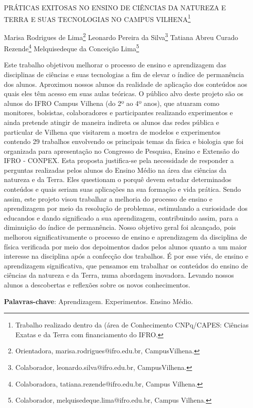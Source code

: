 \documentclass[article,12pt,onesidea,4paper,english,brazil]{abntex2}
\begin{document}
	
	
	\frenchspacing 
	
	\begin{center}
		\LARGE PRÁTICAS EXITOSAS NO ENSINO DE CIÊNCIAS DA NATUREZA E TERRA E SUAS TECNOLOGIAS NO CAMPUS VILHENA\footnote{Trabalho realizado dentro da (área de Conhecimento CNPq/CAPES: Ciências Exatas e da Terra com financiamento do IFRO.}
		
		\normalsize
		Marisa Rodrigues de Lima\footnote{Orientadora, marisa.rodrigues@ifro.edu.br, CampusVilhena.} 
		Leonardo Pereira da Silva\footnote{Colaborador, leonardo.silva@ifro.edu.br, CampusVilhena.} 
		Tatiana Abreu Curado Rezende\footnote{Colaboradora, tatiana.rezende@ifro.edu.br, Campus Vilhena.} 
		Melquisedeque da Conceição Lima\footnote{Colaborador, melquisedeque.lima@ifro.edu.br, Campus Vilhena.} 
	\end{center}
	
	\noindent Este trabalho objetivou melhorar o processo de ensino e aprendizagem das disciplinas de ciências e suas tecnologias a fim de elevar o índice de permanência dos alunos. Aproximou nossos alunos da realidade de aplicação dos conteúdos aos quais eles têm acesso em suas aulas teóricas. O público alvo deste projeto são os alunos do IFRO Campus Vilhena (do 2º ao 4º anos), que atuaram como monitores, bolsistas, colaboradores e participantes realizando experimentos e ainda pretende atingir de maneira indireta os alunos das redes pública e particular de Vilhena que visitarem a mostra de modelos e experimentos contendo 29 trabalhos envolvendo os principais temas da física e biologia que foi organizada para apresentação no Congresso de Pesquisa, Ensino e Extensão do IFRO - CONPEX. Esta proposta justifica-se pela necessidade de responder a perguntas realizadas pelos alunos do Ensino Médio na área das ciências da natureza e da Terra. Eles questionam o porquê devem estudar determinados conteúdos e quais seriam suas aplicações na sua formação e vida prática.  Sendo assim, este projeto visou trabalhar a melhoria do processo de ensino e aprendizagem por meio da resolução de problemas, estimulando a curiosidade dos educandos e dando significado a sua aprendizagem, contribuindo assim, para a diminuição do índice de permanência. Nosso objetivo geral foi alcançado, pois melhorou significativamente o processo de ensino e aprendizagem da disciplina de física verificada por meio dos depoimentos dados pelos alunos quanto a um maior interesse na disciplina após a confecção dos trabalhos. É por esse viés, de ensino e aprendizagem significativa, que pensamos em trabalhar os conteúdos do ensino de ciências da natureza e da Terra, numa abordagem inovadora. Levando nossos alunos a descobertas e reflexões sobre os novos conhecimentos.
	
	\vspace{\onelineskip}
	
	\noindent
	\textbf{Palavras-chave}: Aprendizagem. Experimentos. Ensino Médio.
	
\end{document}
